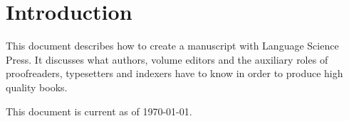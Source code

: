 \chapter{Introduction}
This document describes how to create a manuscript with Language Science Press. It discusses what authors, volume editors and the auxiliary roles of proofreaders, typesetters and indexers have to know in order to produce high quality books.

This document is current as of \today. 
